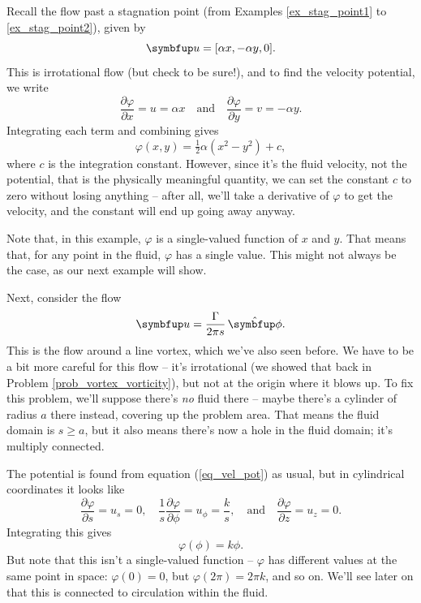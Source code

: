 \begin{example}
\label{ex_stag_pot}
Recall the flow past a stagnation point (from Examples \ref{ex_stag_point1} to \ref{ex_stag_point2}), given by
\[
\uu = [\alpha x, -\alpha y, 0].
\]
This is irrotational flow (but check to be sure!), and to find the velocity potential, we write
\[
\frac{\partial \varphi}{\partial x} = u = \alpha x \quad \text{and} \quad \frac{\partial \varphi}{\partial y} = v = -\alpha y.
\]
Integrating each term and combining gives
\[
\varphi(x, y) = \tfrac{1}{2} \alpha (x^2 - y^2) + c,
\]
where $c$ is the integration constant.  However, since it's the fluid velocity, not the potential, that is the physically meaningful quantity, we can set the constant $c$ to zero without losing anything -- after all, we'll take a derivative of $\varphi$ to get the velocity, and the constant will end up going away anyway.

Note that, in this example, $\varphi$ is a single-valued function of $x$ and $y$.  That means that, for any point in the fluid, $\varphi$ has a single value.  This might not always be the case, as our next example will show.
\end{example}

\begin{example}
\label{ex_pot_vortex}
Next, consider the flow
\[
\uu = \frac{\Gamma}{2\pi s} \, \unit{\phi}.
\]
This is the flow around a line vortex, which we've also seen before.  We have to be a bit more careful for this flow -- it's irrotational (we showed that back in Problem \ref{prob_vortex_vorticity}), but not at the origin where it blows up.  To fix this problem, we'll suppose there's \emph{no} fluid there -- maybe there's a cylinder of radius $a$ there instead, covering up the problem area.  That means the fluid domain is $s \ge a$, but it also means there's now a hole in the fluid domain; it's multiply connected.

The potential is found from equation (\ref{eq_vel_pot}) as usual, but in cylindrical coordinates it looks like
\[
\frac{\partial \varphi}{\partial s} = u_s = 0, \quad \frac{1}{s} \frac{\partial \varphi}{\partial \phi} = u_\phi = \frac{k}{s}, \quad \text{and} \quad \frac{\partial \varphi}{\partial z} = u_z = 0.
\]
Integrating this gives
\begin{equation}
\varphi(\phi) = k \phi.
\end{equation}
But note that this isn't a single-valued function -- $\varphi$ has different values at the same point in space:  $\varphi(0) = 0$, but $\varphi(2\pi) = 2\pi k$, and so on.  We'll see later on that this is connected to circulation within the fluid.

\end{example}

